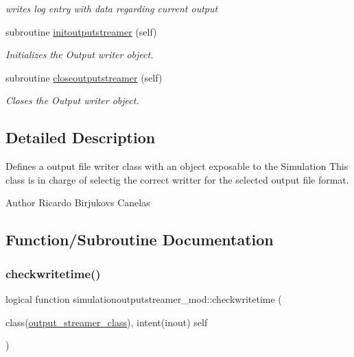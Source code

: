 \begin{DoxyCompactItemize}
\begin{DoxyCompactList}\small\item\em writes log entry with data regarding current output \end{DoxyCompactList}\item 
subroutine \mbox{\hyperlink{namespacesimulationoutputstreamer__mod_a9ab3e2101fbed18ea896729f7201e1aa}{initoutputstreamer}} (self)
\begin{DoxyCompactList}\small\item\em Initializes the Output writer object. \end{DoxyCompactList}\item 
subroutine \mbox{\hyperlink{namespacesimulationoutputstreamer__mod_adc0f21d337c283eee1f5f13b2eb51d52}{closeoutputstreamer}} (self)
\begin{DoxyCompactList}\small\item\em Closes the Output writer object. \end{DoxyCompactList}\end{DoxyCompactItemize}


\subsection{Detailed Description}
Defines a output file writer class with an object exposable to the Simulation This class is in charge of selectig the correct writter for the selected output file format. 

\begin{DoxyAuthor}{Author}
Ricardo Birjukovs Canelas 
\end{DoxyAuthor}


\subsection{Function/\+Subroutine Documentation}
\mbox{\label{namespacesimulationoutputstreamer__mod_a81b788c12b0520901e6fc9b113a10dec}} 
\subsubsection{\texorpdfstring{checkwritetime()}{checkwritetime()}}
{\footnotesize\ttfamily logical function simulationoutputstreamer\+\_\+mod\+::checkwritetime (\begin{DoxyParamCaption}\item[{class(\mbox{\hyperlink{structsimulationoutputstreamer__mod_1_1output__streamer__class}{output\+\_\+streamer\+\_\+class}}), intent(inout)}]{self }\end{DoxyParamCaption})\hspace{0.3cm}{\ttfamily [private]}}



